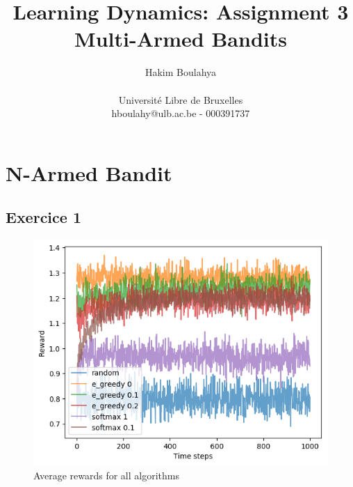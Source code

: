 \documentclass[letterpaper]{article}
\title{Learning Dynamics: Assignment 3 \\
\Large Multi-Armed Bandits}
\author{\Large Hakim Boulahya \\ \\
Université Libre de Bruxelles \\
hboulahy@ulb.ac.be - 000391737
}
\begin{document}
\maketitle
\tableofcontents
\newpage

\section{N-Armed Bandit}


\subsection{Exercice 1}

\begin{figure}[H]
    \centering
    \includegraphics[width=.7\linewidth]{images/assign3/ex1/rewards}
    \caption{Average rewards for all algorithms}
    \label{fig:rewards_ex1}
\end{figure}
\end{document}
